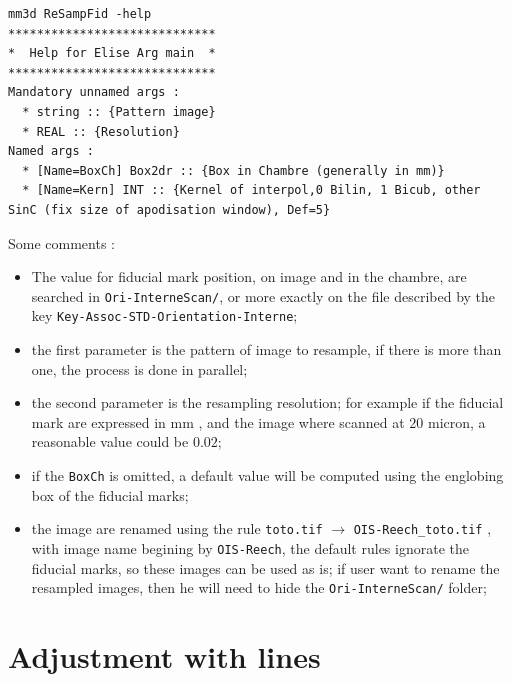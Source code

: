 \begin{verbatim}
mm3d ReSampFid -help
*****************************
*  Help for Elise Arg main  *
*****************************
Mandatory unnamed args : 
  * string :: {Pattern image}
  * REAL :: {Resolution}
Named args : 
  * [Name=BoxCh] Box2dr :: {Box in Chambre (generally in mm)}
  * [Name=Kern] INT :: {Kernel of interpol,0 Bilin, 1 Bicub, other SinC (fix size of apodisation window), Def=5}
\end{verbatim}

Some comments :

\begin{itemize}
   \item  The value for fiducial mark position, on image and in the chambre, are searched in {\tt Ori-InterneScan/},
          or more exactly on the file described by the key {\tt Key-Assoc-STD-Orientation-Interne};

   \item the first parameter is the pattern of image to resample, if there is more than one, the process is done in parallel;

   \item the second parameter is the resampling resolution; for example if the fiducial mark are expressed in mm , and the
         image where scanned at $20$ micron, a reasonable value could be $0.02$;

   \item if the {\tt BoxCh} is omitted, a default value will be computed using the englobing box of the fiducial marks;

   \item the image are renamed using the rule {\tt toto.tif} $\rightarrow$  {\tt OIS-Reech\_toto.tif} , with
         image name begining by {\tt OIS-Reech},  the  default rules ignorate the fiducial marks, so these images
         can be used as is; if user want to rename the resampled images, then he will need to hide the
         {\tt Ori-InterneScan/} folder;

\end{itemize}



\section{Adjustment with lines}



